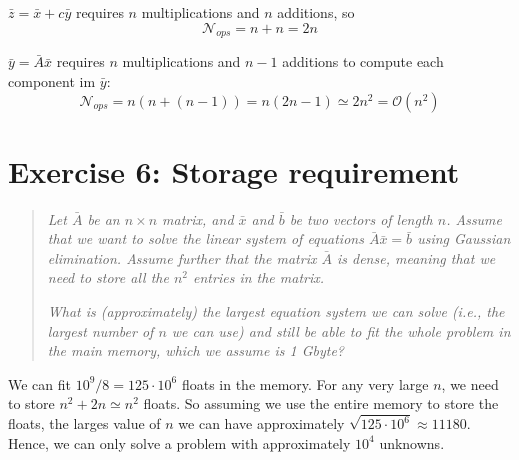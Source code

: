 $\bar{z} = \bar{x} + c \bar{y}$ requires $n$ multiplications and $n$ additions, so 
\begin{equation}
  \mathcal{N}_{ops} = n + n = 2n
\end{equation}

$\bar{y} = \bar{A}\bar{x}$ requires $n$ multiplications and $n-1$ additions to compute each component im $\bar{y}$:
\begin{equation}
  \mathcal{N}_{ops} = n(n+(n-1)) = n(2n-1) \simeq 2n^2 = \mathcal{O}(n^2)
\end{equation}


\section{Exercise 6: Storage requirement} %
\label{sec:exercise_6_storage_requirement}
\begin{quotation}
  \emph{ Let $\bar{A}$ be an $n \times n$ matrix, and $\bar{x}$ and $\bar{b}$ be two vectors of length $n$. Assume that we want to solve the linear system of equations $\bar{A} \bar{x} = \bar{b}$ using Gaussian elimination. Assume further that the matrix $\bar{A}$ is dense, meaning that we need to store all the $n^2$ entries in the matrix. }

  \emph{What is (approximately) the largest equation system we can solve (i.e., the largest number of $n$ we can use) and still be able to fit the whole problem in the main memory, which we assume is 1 Gbyte?}
\end{quotation}

We can fit $10^9 / 8 = 125 \cdot 10^6$ floats in the memory. For any very large $n$, we need to store $n^2+2n \simeq n^2$ floats. So assuming we use the entire memory to store the floats, the larges value of $n$ we can have approximately $\sqrt{125\cdot 10^6} \approx 11180$. Hence, we can only solve a problem with approximately $10^4$ unknowns.





